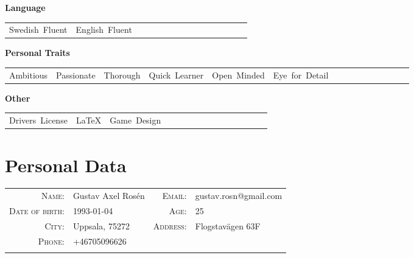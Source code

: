 \documentclass{article}
\newcommand{\pair}[2]{\textsc{\footnotesize{#1}} & \footnotesize{#2} }
\newcommand{\personal}[2]{\pair{#1:}{#2}}
\newcommand{\skill}[1]{\mbox{#1\hspace{1.2ex}}}
\newcommand{\cat}[1]{\vspace{2ex}

\noindent \textbf{#1} 

\begin{tabular}{lllllllllllllll}}
\newcommand{\catend}{\end{tabular}}
\begin{document}
\cat{Language}
\skill{Swedish Fluent}&
\skill{English Fluent}\\
\catend

\cat{Personal Traits}%
\skill{Ambitious}&
\skill{Passionate}&
\skill{Thorough}&
\skill{Quick Learner}&
\skill{Open Minded}&
\skill{Eye for Detail}\\
\catend

\cat{Other}%
\skill{Drivers License}&
\skill{\LaTeX}&
\skill{Game Design}\\
\catend

\section{Personal Data}
\begin{tabular}{rlrl}
\personal{Name}{Gustav Axel Rosén \hspace{9em}}&
\personal{Email}{gustav.rosn@gmail.com}\\
\personal{Date of birth}{1993-01-04}&
\personal{Age}{25}\\
\personal{City}{Uppsala, 75272}&
\personal{Address}{Flogstavägen 63F}\\
\personal{Phone}{+46705096626}\\
\par
\end{tabular}

\clearpage
\end{document}
